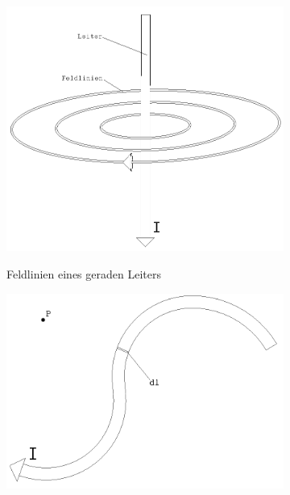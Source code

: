 {{\begin{figure}
    \begin{minipage}[r]{0.5\textwidth}
      \vspace{-16pt}
      \begin{figure}[H]
        \centering
        \includegraphics[width=\textwidth]{Graphics/geraderLeiter.png}
        \caption{Feldlinien eines geraden Leiters}{}
        \label{fieldStrengthStraight}
      \end{figure}
      \begin{figure}[H]
        \centering
        \includegraphics[width=\textwidth]{Graphics/Leiter.png}

\end{figure}
\end{minipage}
\end{figure}}}
